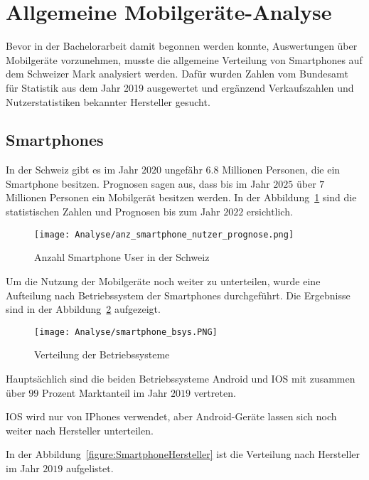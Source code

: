 \cleardoublepage

\section{Allgemeine Mobilgeräte-Analyse}
\label{analyse}
Bevor in der Bachelorarbeit damit begonnen werden konnte, Auswertungen über 
Mobilgeräte vorzunehmen, musste die allgemeine Verteilung von Smartphones
auf dem Schweizer Mark analysiert werden. 
Dafür wurden Zahlen vom Bundesamt für Statistik aus dem Jahr 2019 ausgewertet
und ergänzend Verkaufszahlen und Nutzerstatistiken bekannter Hersteller gesucht.

\subsection{Smartphones}
In der Schweiz gibt es im Jahr $2020$ ungefähr $6.8$ Millionen Personen,
die ein Smartphone besitzen.
Prognosen sagen aus, dass bis im Jahr $2025$ über $7$ Millionen Personen
ein Mobilgerät besitzen werden. 
In der Abbildung~\ref{figure:AnzSmartphoneUser} sind die statistischen
Zahlen und Prognosen bis zum Jahr $2022$ ersichtlich.    

\begin{figure}[h!]
    \centering
    \texttt{[image: Analyse/anz\_smartphone\_nutzer\_prognose.png]}
    \caption{Anzahl Smartphone User in der Schweiz}
    \label{figure:AnzSmartphoneUser}
\end{figure}

\clearpage
    
Um die Nutzung der Mobilgeräte noch weiter zu unterteilen, wurde eine 
Aufteilung nach Betriebssystem der Smartphones durchgeführt.
Die Ergebnisse sind in der Abbildung~\ref{figure:SmartphoneBsys} aufgezeigt.

\begin{figure}[h!]
    \centering
    \texttt{[image: Analyse/smartphone\_bsys.PNG]}
    \caption{Verteilung der Betriebssysteme}
    \label{figure:SmartphoneBsys}
\end{figure}

Hauptsächlich sind die beiden Betriebssysteme Android und IOS mit zusammen
über $99$ Prozent Marktanteil im Jahr $2019$ vertreten.

\clearpage

IOS wird nur von IPhones verwendet, aber Android-Geräte lassen sich noch weiter
nach Hersteller unterteilen. 

In der Abbildung~\ref{figure:SmartphoneHersteller} ist die Verteilung
nach Hersteller im Jahr $2019$ aufgelistet.

